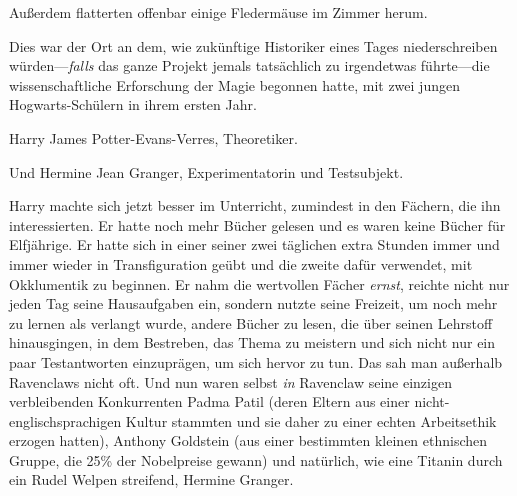 Außerdem flatterten offenbar einige Fledermäuse im Zimmer herum.

Dies war der Ort an dem, wie zukünftige Historiker eines Tages niederschreiben würden—\emph{falls} das ganze Projekt jemals tatsächlich zu irgendetwas führte—die wissenschaftliche Erforschung der Magie begonnen hatte, mit zwei jungen Hogwarts-Schülern in ihrem ersten Jahr.

Harry James Potter-Evans-Verres, Theoretiker.

Und Hermine Jean Granger, Experimentatorin und Testsubjekt.

Harry machte sich jetzt besser im Unterricht, zumindest in den Fächern, die ihn interessierten. Er hatte noch mehr Bücher gelesen und es waren keine Bücher für Elfjährige. Er hatte sich in einer seiner zwei täglichen extra Stunden immer und immer wieder in Transfiguration geübt und die zweite dafür verwendet, mit Okklumentik zu beginnen. Er nahm die wertvollen Fächer \emph{ernst}, reichte nicht nur jeden Tag seine Hausaufgaben ein, sondern nutzte seine Freizeit, um noch mehr zu lernen als verlangt wurde, andere Bücher zu lesen, die über seinen Lehrstoff hinausgingen, in dem Bestreben, das Thema zu meistern und sich nicht nur ein paar Testantworten einzuprägen, um sich hervor zu tun. Das sah man außerhalb Ravenclaws nicht oft. Und nun waren selbst \emph{in} Ravenclaw seine einzigen verbleibenden Konkurrenten Padma Patil (deren Eltern aus einer nicht-englischsprachigen Kultur stammten und sie daher zu einer echten Arbeitsethik erzogen hatten), Anthony Goldstein (aus einer bestimmten kleinen ethnischen Gruppe, die 25\% der Nobelpreise gewann) und natürlich, wie eine Titanin durch ein Rudel Welpen streifend, Hermine Granger.

